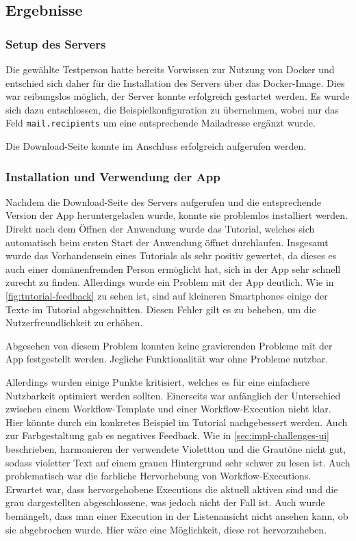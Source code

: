 \subsection{Ergebnisse}

\subsubsection{Setup des Servers}

Die gewählte Testperson hatte bereits Vorwissen zur Nutzung von Docker und entschied sich daher für
die Installation des Servers über das Docker-Image. Dies war reibungslos möglich, der Server konnte
erfolgreich gestartet werden. Es wurde sich dazu entschlossen, die Beispielkonfiguration zu
übernehmen, wobei nur das Feld \texttt{mail.recipients} um eine entsprechende Mailadresse ergänzt
wurde.

Die Download-Seite konnte im Anschluss erfolgreich aufgerufen werden.

\subsubsection{Installation und Verwendung der App}

Nachdem die Download-Seite des Servers aufgerufen und die entsprechende Version der App
heruntergeladen wurde, konnte sie problemlos installiert werden.
Direkt nach dem Öffnen der Anwendung wurde das Tutorial, welches sich automatisch beim ersten Start
der Anwendung öffnet durchlaufen.
Insgesamt wurde das Vorhandensein eines Tutorials als sehr positiv gewertet, da dieses es auch einer
domänenfremden Person ermöglicht hat, sich in der App sehr schnell zurecht zu finden. Allerdings
wurde ein Problem mit der App deutlich. Wie in \autoref{fig:tutorial-feedback} zu sehen ist, sind
auf kleineren Smartphones einige der Texte im Tutorial abgeschnitten. Diesen Fehler gilt es zu
beheben, um die Nutzerfreundlichkeit zu erhöhen.

Abgesehen von diesem Problem konnten keine gravierenden Probleme mit der App festgestellt werden.
Jegliche Funktionalität war ohne Probleme nutzbar.

Allerdings wurden einige Punkte kritisiert, welches es für eine einfachere Nutzbarkeit optimiert
werden sollten.
Einerseits war anfänglich der Unterschied zwischen einem Workflow-Template und einer
Workflow-Execution nicht klar. Hier könnte durch ein konkretes Beispiel im Tutorial nachgebessert
werden. Auch zur Farbgestaltung gab es negatives Feedback. Wie in \autoref{sec:impl-challenges-ui}
beschrieben, harmonieren der verwendete Violettton und die Grautöne nicht gut, sodass violetter Text
auf einem grauen Hintergrund sehr schwer zu lesen ist. Auch problematisch war die farbliche
Hervorhebung von Workflow-Executions. Erwartet war, dass hervorgehobene Executions die aktuell
aktiven sind und die grau dargestellten abgeschlossene, was jedoch nicht der Fall ist. Auch wurde
bemängelt, dass man einer Execution in der Listenansicht nicht ansehen kann, ob sie abgebrochen
wurde. Hier wäre eine Möglichkeit, diese rot hervorzuheben.

